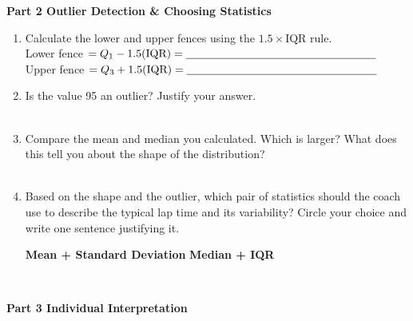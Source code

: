 \documentclass[10pt]{article}
\begin{document}
\vspace{0.12in}

{\large\bfseries\color{navy} Part 2 \quad Outlier Detection \& Choosing Statistics}

\vspace{0.10in}

\begin{enumerate}[leftmargin=1.5em, itemsep=8pt, resume]

  \item Calculate the lower and upper fences using the $1.5 \times \text{IQR}$ rule.\\[5pt]
        Lower fence $= Q_1 - 1.5(\text{IQR}) = \blank{6cm}$\\[4pt]
        Upper fence $= Q_3 + 1.5(\text{IQR}) = \blank{6cm}$

  \item Is the value 95 an outlier? Justify your answer.\\[5pt]
        \writeline\\[1pt]\writeline

  \item Compare the mean and median you calculated.  Which is larger?
        What does this tell you about the shape of the distribution?\\[5pt]
        \writeline\\[1pt]\writeline

  \item Based on the shape and the outlier, which pair of statistics should the
        coach use to describe the typical lap time and its variability?
        Circle your choice and write one sentence justifying it.

        \vspace{8pt}
        \hspace{2em}\textbf{Mean + Standard Deviation}
        \hspace{4em}\textbf{Median + IQR}

        \vspace{8pt}
        \writeline\\[1pt]\writeline

\end{enumerate}

\vspace{0.12in}

{\large\bfseries\color{navy} Part 3 \quad Individual Interpretation}
\end{document}
